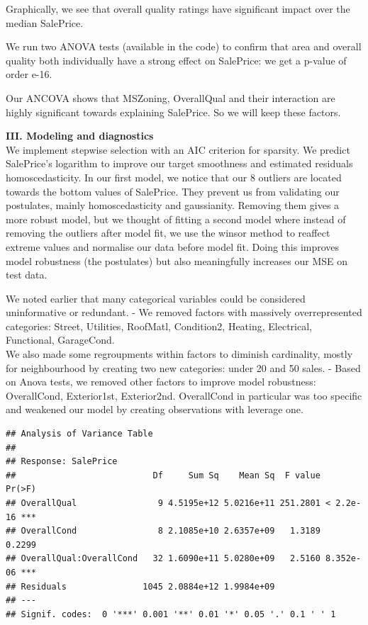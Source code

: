 \documentclass[]{article}
\begin{document}
Graphically, we see that overall quality ratings have significant impact
over the median SalePrice.

We run two ANOVA tests (available in the code) to confirm that area and
overall quality both individually have a strong effect on SalePrice: we
get a p-value of order e-16.

Our ANCOVA shows that MSZoning, OverallQual and their interaction are
highly significant towards explaining SalePrice. So we will keep these
factors.

\textbf{III. Modeling and diagnostics}\\
We implement stepwise selection with an AIC criterion for sparsity. We
predict SalePrice's logarithm to improve our target smoothness and
estimated residuals homoscedasticity. In our first model, we notice that
our 8 outliers are located towards the bottom values of SalePrice. They
prevent us from validating our postulates, mainly homoscedasticity and
gaussianity. Removing them gives a more robust model, but we thought of
fitting a second model where instead of removing the outliers after
model fit, we use the winsor method to reaffect extreme values and
normalise our data before model fit. Doing this improves model
robustness (the postulates) but also meaningfully increases our MSE on
test data.

We noted earlier that many categorical variables could be considered
uninformative or redundant. - We removed factors with massively
overrepresented categories: Street, Utilities, RoofMatl, Condition2,
Heating, Electrical, Functional, GarageCond.\\
We also made some regroupments within factors to diminish cardinality,
mostly for neighbourhood by creating two new categories: under 20 and 50
sales. - Based on Anova tests, we removed other factors to improve model
robustness: OverallCond, Exterior1st, Exterior2nd. OverallCond in
particular was too specific and weakened our model by creating
observations with leverage one.

\begin{verbatim}
## Analysis of Variance Table
## 
## Response: SalePrice
##                           Df     Sum Sq    Mean Sq  F value    Pr(>F)    
## OverallQual                9 4.5195e+12 5.0216e+11 251.2801 < 2.2e-16 ***
## OverallCond                8 2.1085e+10 2.6357e+09   1.3189    0.2299    
## OverallQual:OverallCond   32 1.6090e+11 5.0280e+09   2.5160 8.352e-06 ***
## Residuals               1045 2.0884e+12 1.9984e+09                       
## ---
## Signif. codes:  0 '***' 0.001 '**' 0.01 '*' 0.05 '.' 0.1 ' ' 1
\end{verbatim}
\end{document}
